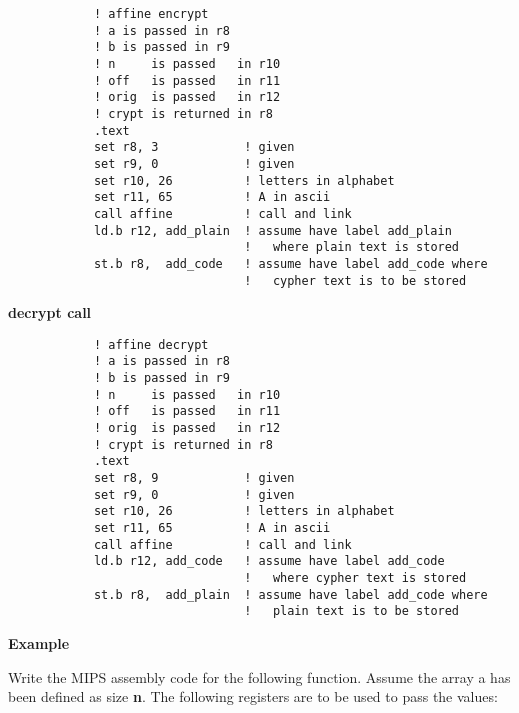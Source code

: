    \begin{verbatim}
            ! affine encrypt
            ! a is passed in r8
            ! b is passed in r9
            ! n     is passed   in r10
            ! off   is passed   in r11
            ! orig  is passed   in r12
            ! crypt is returned in r8
            .text
            set r8, 3            ! given
            set r9, 0            ! given
            set r10, 26          ! letters in alphabet
            set r11, 65          ! A in ascii
            call affine          ! call and link
            ld.b r12, add_plain  ! assume have label add_plain
                                 !   where plain text is stored
            st.b r8,  add_code   ! assume have label add_code where
                                 !   cypher text is to be stored
    \end{verbatim}


    \textbf{decrypt call}

    \begin{verbatim}
            ! affine decrypt
            ! a is passed in r8
            ! b is passed in r9
            ! n     is passed   in r10
            ! off   is passed   in r11
            ! orig  is passed   in r12
            ! crypt is returned in r8
            .text
            set r8, 9            ! given
            set r9, 0            ! given
            set r10, 26          ! letters in alphabet
            set r11, 65          ! A in ascii
            call affine          ! call and link
            ld.b r12, add_code   ! assume have label add_code
                                 !   where cypher text is stored
            st.b r8,  add_plain  ! assume have label add_code where
                                 !   plain text is to be stored
    \end{verbatim}






\vspace{6pt}
\textbf{Example}
\vspace{6pt}


Write the MIPS assembly code for the following function.  Assume the array a has been defined as size \textbf{n}.  The following registers are to be used to pass the values:



